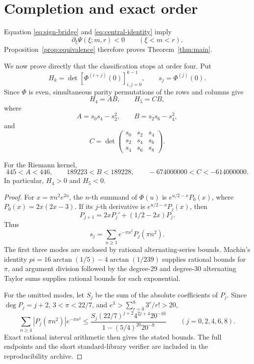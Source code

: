 \section{Completion and exact order}\label{sec:completion}

Equation \eqref{eq:sign-bridge} and \eqref{eq:central-identity} imply
\[
 \partial_\xi\Psi(\xi;m,r)<0\qquad(\xi<m<r).
\]
Proposition~\ref{prop:equivalence} therefore proves
Theorem~\ref{thm:main}.

We now prove directly that the classification stops at order four.  Put
\[
 H_k=\det[\Phi^{(i+j)}(0)]_{i,j=0}^{k-1},\qquad
 s_j=\Phi^{(j)}(0).
\]
Since \(\Phi\) is even, simultaneous parity permutations of the rows and
columns give
\[
 H_4=AB,\qquad H_5=CB,
\]
where
\[
 A=s_0s_4-s_2^2,\qquad B=s_2s_6-s_4^2,
\]
and
\[
 C=\det\begin{pmatrix}
 s_0&s_2&s_4\\
 s_2&s_4&s_6\\
 s_4&s_6&s_8
 \end{pmatrix}.
\]

\begin{lemma}\label{lem:origin-pf5-sign}
For the Riemann kernel,
\[
 445<A<446,\qquad 189223<B<189228,
 \qquad -674000000<C<-614000000.
\]
In particular, \(H_4>0\) and \(H_5<0\).
\end{lemma}

\begin{proof}
For \(x=\pi n^2e^{2u}\), the \(n\)-th summand of \(\Phi(u)\) is
\(e^{u/2-x}P_0(x)\), where \(P_0(x)=2x(2x-3)\).  If its \(j\)-th derivative
is \(e^{u/2-x}P_j(x)\), then
\[
 P_{j+1}=2xP_j'+(1/2-2x)P_j.
\]
Thus
\[
 s_j=\sum_{n\ge1}e^{-\pi n^2}P_j(\pi n^2).
\]
The first three modes are enclosed by rational alternating-series bounds.
Machin's identity
\(pi=16\arctan(1/5)-4\arctan(1/239)\) supplies rational bounds for \(\pi\),
and argument division followed by the degree-29 and degree-30 alternating
Taylor sums supplies rational bounds for each exponential.

For the omitted modes, let \(S_j\) be the sum of the absolute coefficients of
\(P_j\).  Since \(\deg P_j=j+2\), \(3<\pi<22/7\), and
\(e^3>\sum_{r=0}^8 3^r/r!>20\),
\[
 \sum_{n\ge4}|P_j(\pi n^2)|e^{-\pi n^2}
 \leq
 \frac{S_j(22/7)^{j+2}4^{2j+4}20^{-16}}
 {1-(5/4)^{20}20^{-9}}
 \qquad(j=0,2,4,6,8).
\]
Exact rational interval arithmetic then gives the stated bounds.  The full
endpoints and the short standard-library verifier are included in the
reproducibility archive.
\end{proof}

